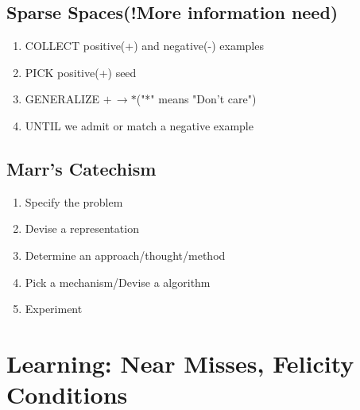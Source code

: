 \documentclass[12pt]{book}
\begin{document}
\subsection{Sparse Spaces(!More information need)}
\begin{enumerate}
	\item COLLECT positive(+) and negative(-) examples
	\item PICK positive(+) seed
	\item GENERALIZE $+\,\longrightarrow *$("*" means "Don't care")
	\item UNTIL we admit or match a negative example
\end{enumerate}
\subsection{Marr's Catechism}
\begin{enumerate}
	\item Specify the problem
	\item Devise a representation
	\item Determine an approach/thought/method
	\item Pick a mechanism/Devise a algorithm
	\item Experiment 
\end{enumerate}
\newpage
\section{Learning: Near Misses, Felicity Conditions}
\end{document}
